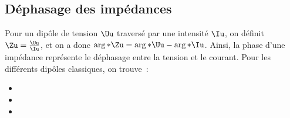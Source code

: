 \documentclass[../../main/main.tex]{subfiles}
\begin{document}
\subsection{Déphasage des impédances}
Pour un dipôle de tension $\Uu$ traversé par une intensité $\Iu$, on
définit $\Zu = \frac{\Uu}{\Iu}$, et on a donc $\arg*{\Zu} =
	\arg*{\Uu} - \arg*{\Iu}$. Ainsi, la phase d'une impédance représente le
déphasage entre la tension et le courant. Pour les différents dipôles
classiques, on trouve~:
\begin{itemize}
	\item {}%
	\item {}%
	\item {}%
	      \vspace{-15pt}
\end{itemize}
\end{document}
